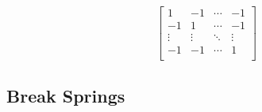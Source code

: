 \begin{equation}\label{eq:implementation:correctionMatrix}
	\begin{bmatrix}
		1 			& -1 			& \cdots & -1\\
		-1 			& 1				& \cdots & -1\\	
		\vdots 		& \vdots		& \ddots & \vdots\\
		-1 			& -1			& \cdots & 1\\		
	\end{bmatrix}
\end{equation}


\subsection{Break Springs}
\label{s:implementation:break}



